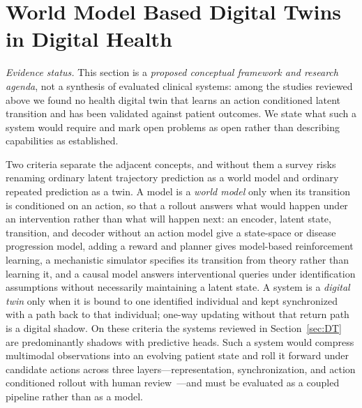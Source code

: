 \documentclass[journal]{IEEEtran}
\newif\ifsubmission
\begin{document}
\fi

\section{World Model Based Digital Twins in Digital Health}
\label{sec:world_model_dt}
\ifsubmission
\emph{Evidence status.} This section is a \emph{proposed conceptual framework and research agenda}, not a synthesis of evaluated clinical systems: among the studies reviewed above we found no health digital twin that learns an action conditioned latent transition and has been validated against patient outcomes. We state what such a system would require and mark open problems as open rather than describing capabilities as established.

Two criteria separate the adjacent concepts, and without them a survey risks renaming ordinary latent trajectory prediction as a world model and ordinary repeated prediction as a twin. A model is a \emph{world model} only when its transition is conditioned on an action, so that a rollout answers what would happen under an intervention rather than what will happen next: an encoder, latent state, transition, and decoder without an action model give a state-space or disease progression model, adding a reward and planner gives model-based reinforcement learning, a mechanistic simulator specifies its transition from theory rather than learning it, and a causal model answers interventional queries under identification assumptions without necessarily maintaining a latent state. A system is a \emph{digital twin} only when it is bound to one identified individual and kept synchronized with a path back to that individual; one-way updating without that return path is a digital shadow. On these criteria the systems reviewed in Section~\ref{sec:DT} are predominantly shadows with predictive heads. Such a system would compress multimodal observations into an evolving patient state and roll it forward under candidate actions across three layers---representation, synchronization, and action conditioned rollout with human review~\cite{Sadee2025MedicalDT}---and must be evaluated as a coupled pipeline rather than as a model.
\end{document}
